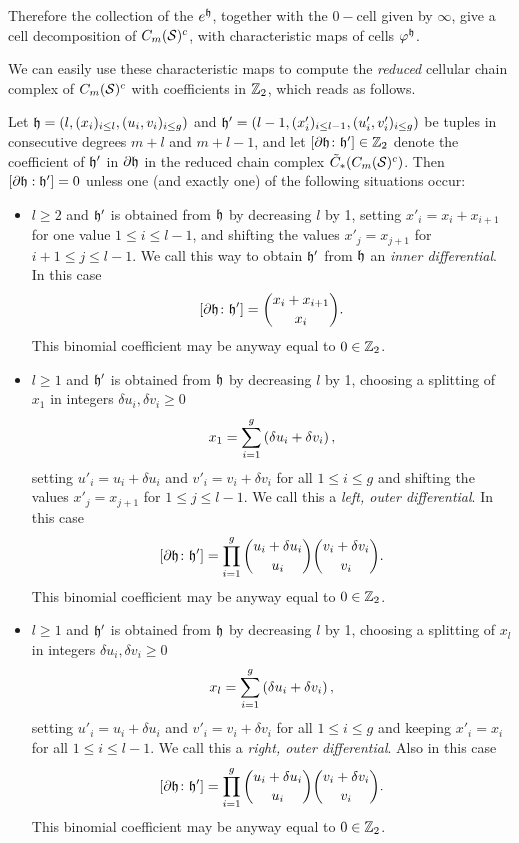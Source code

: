 Therefore the collection of the $e^{\mathfrak{h}}$, together with the $0-$cell given by $\infty$,
give a cell decomposition of $C_m(\mathcal{S})^c$, with characteristic maps of cells $\varphi^{\mathfrak{h}}$.

We can easily use these characteristic maps to compute the \emph{reduced} cellular chain complex of $C_m(\mathcal{S})^c$
with coefficients in $\mathbb{Z}_2$, which
reads as follows.
\begin{lem}
\label{lem:doperatoropenmodtwo}
Let $\mathfrak{h}=(l,(x_i)_{i\leq l},(u_i,v_i)_{i\leq g})$ and
$\mathfrak{h}'=(l-1,(x'_i)_{i\leq l-1},(u'_i,v'_i)_{i\leq g})$
be tuples in consecutive degrees $m+l$ and $m+l-1$, and let $[\partial \mathfrak{h}\colon\mathfrak{h}']\in\mathbb{Z}_2$ denote the coefficient
of $\mathfrak{h}'$ in $\partial \mathfrak{h}$ in the reduced chain complex $\tilde{C}_*(C_m(\mathcal{S})^c)$.
Then $[\partial \mathfrak{h}:\mathfrak{h}']=0$ unless one (and exactly one) of the following situations occur:
\begin{itemize}
 \item $l\geq 2$ and $\mathfrak{h}'$ is obtained from $\mathfrak{h}$ by decreasing $l$ by 1, setting $x'_i=x_i+x_{i+1}$
 for one value $1\leq i\leq l-1$, and shifting the values
 $x'_j=x_{j+1}$ for $i+1\leq j\leq l-1$. We call this way to obtain $\mathfrak{h}'$ from $\mathfrak{h}$ an \emph{inner differential}.
 In this case
 \[
  [\partial \mathfrak{h}\colon\mathfrak{h}']=\binom{x_i+x_{i+1}}{x_i}.
 \]
 This binomial coefficient may be anyway equal to $0\in\mathbb{Z}_2$.
 \item $l\geq 1$ and $\mathfrak{h}'$ is obtained from $\mathfrak{h}$ by decreasing $l$ by 1, choosing a splitting of $x_1$
 in integers $\delta u_i,\delta v_i\geq 0$
 \[
  x_1=\sum_{i=1}^g \left(\delta u_i+\delta v_i\right),
 \]
 setting $u'_i=u_i+\delta u_i$ and $v'_i=v_i+\delta v_i$ for all $1\leq i\leq g$ and shifting the values
 $x'_j=x_{j+1}$ for $1\leq j\leq l-1$. We call this a \emph{left, outer differential}. In this case
 \[
  [\partial \mathfrak{h}\colon\mathfrak{h}']=\prod_{i=1}^g\binom{u_i+\delta u_i}{u_i}\binom{v_i+\delta v_i}{v_i}.
 \]
 This binomial coefficient may be anyway equal to $0\in\mathbb{Z}_2$.
 \item $l\geq 1$ and $\mathfrak{h}'$ is obtained from $\mathfrak{h}$ by decreasing $l$ by 1, choosing a splitting of $x_l$
 in integers $\delta u_i,\delta v_i\geq 0$
 \[
  x_l=\sum_{i=1}^g \left(\delta u_i+\delta v_i\right),
 \]
 setting $u'_i=u_i+\delta u_i$ and $v'_i=v_i+\delta v_i$ for all $1\leq i\leq g$ and keeping $x'_i=x_i$ for all $1\leq i\leq l-1$.
 We call this a \emph{right, outer differential}. Also in this case
 \[
  [\partial \mathfrak{h}\colon\mathfrak{h}']=\prod_{i=1}^g\binom{u_i+\delta u_i}{u_i}\binom{v_i+\delta v_i}{v_i}.
 \]
 This binomial coefficient may be anyway equal to $0\in\mathbb{Z}_2$.
\end{itemize}
\end{lem}
